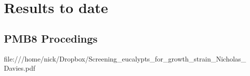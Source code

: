 \section{Results to date}
\subsection{PMB8 Procedings}

  file:///home/nick/Dropbox/Screening_eucalypts_for_growth_strain_Nicholas_Davies.pdf

  
